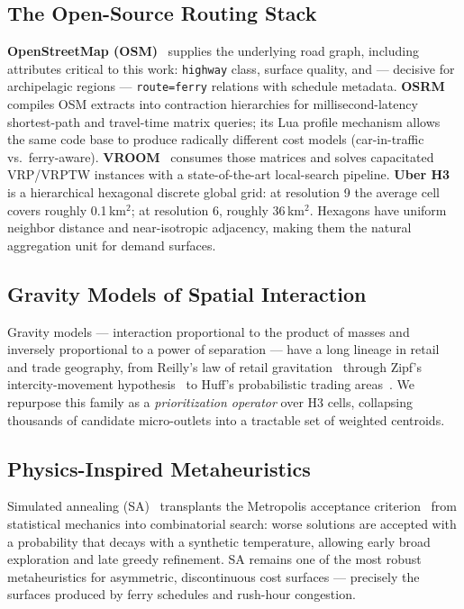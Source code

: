 \documentclass[11pt,a4paper,twocolumn]{article}
\begin{document}
\subsection{The Open-Source Routing Stack}

\textbf{OpenStreetMap (OSM)}~\cite{haklay2008} supplies the underlying road
graph, including attributes critical to this work: \texttt{highway} class,
surface quality, and --- decisive for archipelagic regions ---
\texttt{route=ferry} relations with schedule metadata.
\textbf{OSRM}~\cite{luxen2011} compiles OSM extracts into contraction
hierarchies for millisecond-latency shortest-path and travel-time matrix
queries; its Lua profile mechanism allows the same code base to produce
radically different cost models (car-in-traffic vs.\ ferry-aware).
\textbf{VROOM}~\cite{vroom} consumes those matrices and solves
capacitated VRP/VRPTW instances with a state-of-the-art local-search
pipeline. \textbf{Uber H3}~\cite{brodsky2018} is a hierarchical hexagonal
discrete global grid: at resolution 9 the average cell covers roughly
0.1\,km\(^2\); at resolution 6, roughly 36\,km\(^2\). Hexagons have uniform
neighbor distance and near-isotropic adjacency, making them the natural
aggregation unit for demand surfaces.

\subsection{Gravity Models of Spatial Interaction}

Gravity models --- interaction proportional to the product of masses and
inversely proportional to a power of separation --- have a long lineage in
retail and trade geography, from Reilly's law of retail
gravitation~\cite{reilly1931} through Zipf's intercity-movement
hypothesis~\cite{zipf1946} to Huff's probabilistic trading
areas~\cite{huff1964}. We repurpose this family as a \emph{prioritization
operator} over H3 cells, collapsing thousands of candidate micro-outlets
into a tractable set of weighted centroids.

\subsection{Physics-Inspired Metaheuristics}

Simulated annealing (SA)~\cite{kirkpatrick1983, cerny1985} transplants the
Metropolis acceptance criterion~\cite{metropolis1953} from statistical
mechanics into combinatorial search: worse solutions are accepted with a
probability that decays with a synthetic temperature, allowing early broad
exploration and late greedy refinement. SA remains one of the most robust
metaheuristics for asymmetric, discontinuous cost surfaces --- precisely the
surfaces produced by ferry schedules and rush-hour congestion.
\end{document}
